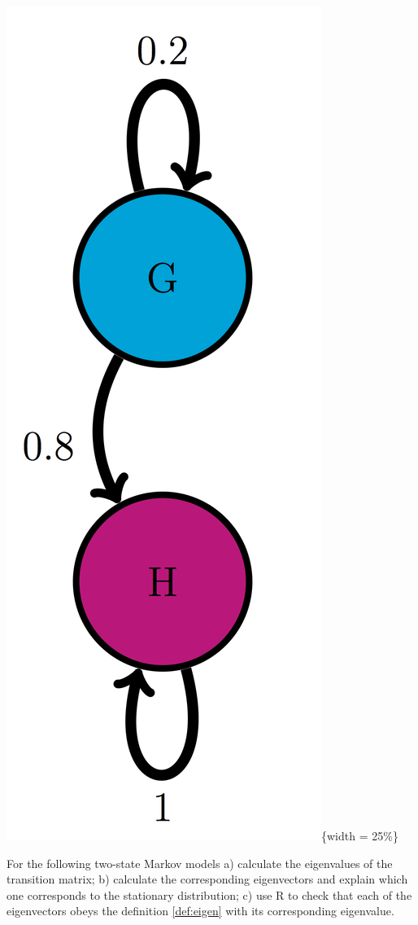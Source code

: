 \documentclass[
  letterpaper,
  DIV=11,
  numbers=noendperiod]{scrreprt}
\begin{document}
\includegraphics{./ch10/GH_trans_diag.png}\{width = 25\%\}

For the following two-state Markov models a) calculate the eigenvalues
of the transition matrix; b) calculate the corresponding eigenvectors
and explain which one corresponds to the stationary distribution; c) use
R to check that each of the eigenvectors obeys the definition
\ref{def:eigen} with its corresponding eigenvalue.
\end{document}
